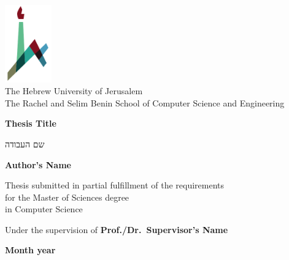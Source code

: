 \documentclass[11pt, oneside, onecolumn]{book}
\begin{document}

\begin{titlepage}
    \begin{center}
        \vspace*{1cm}
        
        \includegraphics[width=0.15\textwidth]{huji_logo_notext.pdf}\\
        The Hebrew University of Jerusalem\\
        The Rachel and Selim Benin School of Computer Science and Engineering
        
        \vspace{2cm}
        
        {\Large \textbf{Thesis Title}}
        
        \vspace{1cm}
        {\Large שם העבודה}
        
        \vspace{1.5cm}
        
        \textbf{Author's Name}
        
        \vspace{1cm}
        
        Thesis submitted in partial fulfillment of the requirements\\for the Master of Sciences degree\\
        in Computer Science
        
        \vspace{1cm}
        
        Under the supervision of \textbf{Prof./Dr.~Supervisor's Name}
        
        \vfill
        
        \textbf{Month year}
    \end{center}
\end{titlepage}


%

\tableofcontents
\listoffigures

% 








\printbibliography[heading=bibliography]
\end{document}
